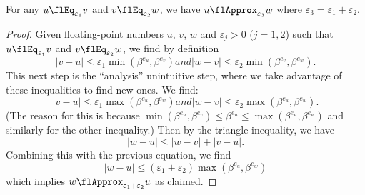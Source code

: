 \begin{thm}
  For any $u\flEq_{\varepsilon_{1}}v$ and $v\flEq_{\varepsilon_{2}}w$,
  we have $u\flApprox_{\varepsilon_{3}}w$ where $\varepsilon_{3}=\varepsilon_{1}+\varepsilon_{2}$.
\end{thm}
\begin{proof}
  Given floating-point numbers $u$, $v$, $w$ and $\varepsilon_{j}>0$ ($j=1,2$)
  such that $u\flEq_{\varepsilon_{1}}v$ and $v\flEq_{\varepsilon_{2}}w$,
  we find by definition
  \begin{subequations}
  \begin{equation}
    |v-u|\leq\varepsilon_{1}\min(\beta^{e_{u}},\beta^{e_{v}})
  \end{equation}
  and
  \begin{equation}
    |w-v|\leq\varepsilon_{2}\min(\beta^{e_{v}},\beta^{e_{w}}).
  \end{equation}
  \end{subequations}
  This next step is the ``analysis'' unintuitive step, where we take
  advantage of these inequalities to find new ones. We find:
  \begin{subequations}
  \begin{equation}
    |v-u|\leq\varepsilon_{1}\max(\beta^{e_{u}},\beta^{e_{w}})
  \end{equation}
  and
  \begin{equation}
    |w-v|\leq\varepsilon_{2}\max(\beta^{e_{u}},\beta^{e_{w}}).
  \end{equation}
  \end{subequations}
  (The reason for this is because $\min(\beta^{e_{u}},\beta^{e_{v}})\leq\beta^{e_{u}}\leq\max(\beta^{e_{u}},\beta^{e_{w}})$
  and similarly for the other inequality.)
  Then by the triangle inequality, we have
  \begin{equation}
    |w-u|\leq|w-v| + |v-u|.
  \end{equation}
  Combining this with the previous equation, we find
  \begin{equation}
    |w-u|\leq(\varepsilon_{1}+\varepsilon_{2})\max(\beta^{e_{u}},\beta^{e_{w}})
  \end{equation}
  which implies $w\flApprox_{\varepsilon_{1}+\varepsilon_{2}}u$ as claimed.  
\end{proof}

